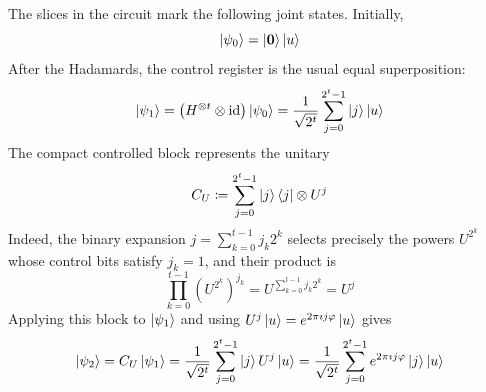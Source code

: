 The slices in the circuit mark the following joint states.
Initially,
\begin{equation}\label{eq:phase-estimation-state-zero}
\ket{\psi_0}
=
\ket{{\boldsymbol{0}}}\ket u
\end{equation}
After the Hadamards, the control register is the usual equal superposition:
\begin{equation}\label{eq:phase-estimation-state-one}
\ket{\psi_1}
=
\left(
H^{\otimes t}\otimes\operatorname{id}
\right)
\ket{\psi_0}
=
\frac{1}{\sqrt{2^t}}
\sum_{j=0}^{2^t-1}
\ket j\ket u
\end{equation}
The compact controlled block represents the unitary
\begin{equation}\label{eq:phase-estimation-controlled-block}
C_U
\coloneqq
\sum_{j=0}^{2^t-1}
\ket j\bra j
\otimes
U^j
\end{equation}
Indeed, the binary expansion
\(
j=\sum_{k=0}^{t-1}j_k2^k
\)
selects precisely the powers
\(
U^{2^k}
\)
whose control bits satisfy \(j_k=1\), and their product is
\[
\prod_{k=0}^{t-1}
\left(
U^{2^k}
\right)^{j_k}
=
U^{\sum_{k=0}^{t-1}j_k2^k}
=
U^j
\]
Applying this block to \(\ket{\psi_1}\) and using
\(
U^j\ket u=e^{2\pi\imath j\varphi}\ket u
\)
gives
\begin{equation}\label{eq:phase-estimation-state-two}
\ket{\psi_2}
=
C_U\ket{\psi_1}
=
\frac{1}{\sqrt{2^t}}
\sum_{j=0}^{2^t-1}
\ket jU^j\ket u
=
\frac{1}{\sqrt{2^t}}
\sum_{j=0}^{2^t-1}
e^{2\pi\imath j\varphi}
\ket j\ket u
\end{equation}

